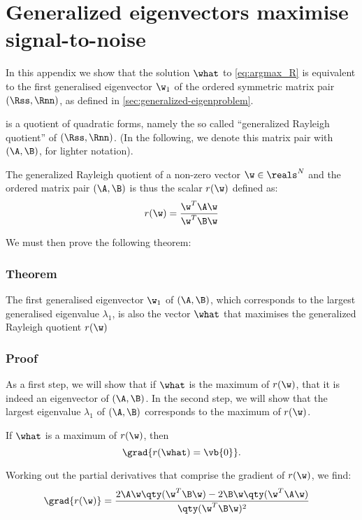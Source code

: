 \chapter{Generalized eigenvectors maximise signal-to-noise}
\label{apx:GEvecs-maximise-SNR}

In this appendix we show that the solution $\what$ to \cref{eq:argmax_R} is equivalent to the first generalised eigenvector $\w_1$ of the ordered symmetric matrix pair $(\Rss, \Rnn)$, as defined in \cref{sec:generalized-eigenproblem}.

 is a quotient of quadratic forms, namely the so called ``generalized Rayleigh quotient'' of $(\Rss, \Rnn)$. (In the following, we denote this matrix pair with $(\A,\B)$, for lighter notation).

The generalized Rayleigh quotient of a non-zero vector $\w \in \reals^N$ and the ordered matrix pair $(\A,\B)$ is thus the scalar $r(\w)$ defined as:
%
\begin{equation}
\label{eq:Rayleigh}
r(\w) = \frac{\w^T \A \w}
             {\w^T \B \w}
\end{equation}

We must then prove the following theorem:



\subsection{Theorem}

The first generalised eigenvector $\w_1$ of $(\A,\B)$, which corresponds to the largest generalised eigenvalue $\lambda_1$, is also the vector $\what$ that maximises the generalized Rayleigh quotient $r(\w)$




\subsection{Proof}

As a first step, we will show that if $\what$ is the maximum of $r(\w)$, that it is indeed an eigenvector of $(\A,\B)$. In the second step, we will show that the largest eigenvalue $\lambda_1$ of $(\A,\B)$ corresponds to the maximum of $r(\w)$.

If $\what$ is a maximum of $r(\w)$, then
\begin{equation}
\label{eq:critical}
\grad{r(\what) = \vb{0}}.
\end{equation}

Working out the partial derivatives that comprise the gradient of $r(\w)$, we find:
\begin{align*}
\grad{r(\w)} &= \frac{2 \A \w \qty(\w^T \B \w) 
                      - 2 \B \w \qty(\w^T \A \w)}
                     {\qty(\w^T \B \w)^2}
\end{align*}

